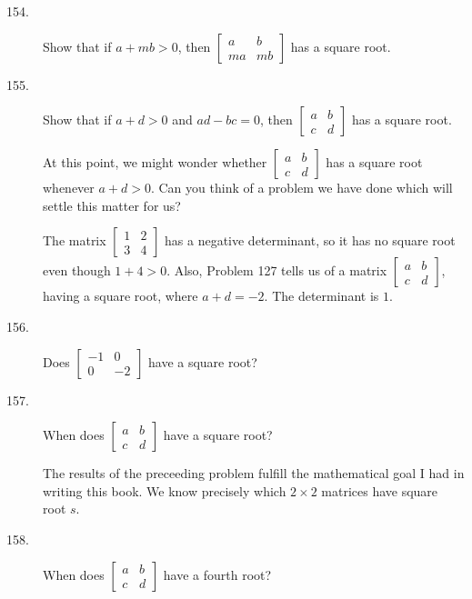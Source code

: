\documentclass{article}
\begin{document}
\begin{description}
  \item[154.] Show that if $a+mb > 0$, then $\begin{bmatrix} a & b \\ ma & mb \end{bmatrix}$ has a square root.

  \item[155.] Show that if $a+d > 0$ and $ad-bc = 0$, then $\begin{bmatrix} a & b \\ c & d \end{bmatrix}$ has a square root.

  \item[] At this point, we might wonder whether $\begin{bmatrix} a & b \\ c & d \end{bmatrix}$ has a square root whenever $a+d > 0$. Can you think of a problem we have done which will settle this matter for us?

  \item[] The matrix $\begin{bmatrix} 1 & 2 \\ 3 & 4 \end{bmatrix}$ has a negative determinant, so it has no square root even though $1+4 > 0$. Also, Problem 127 tells us of a matrix $\begin{bmatrix} a & b \\ c & d \end{bmatrix}$, having a square root, where $a+d = -2$. The determinant is $1$.

  \item[156.] Does $\begin{bmatrix} -1 & 0 \\ 0 & -2 \end{bmatrix}$ have a square root?

  \item[157.] When does $\begin{bmatrix} a & b \\ c & d \end{bmatrix}$ have a square root?

  \item[] The results of the preceeding problem fulfill the mathematical goal I had in writing this book. We know precisely which $2 \times 2$ matrices have square root $s$.

  \item[158.] When does $\begin{bmatrix} a & b \\ c & d \end{bmatrix}$ have a fourth root?

\end{description}
\end{document}
